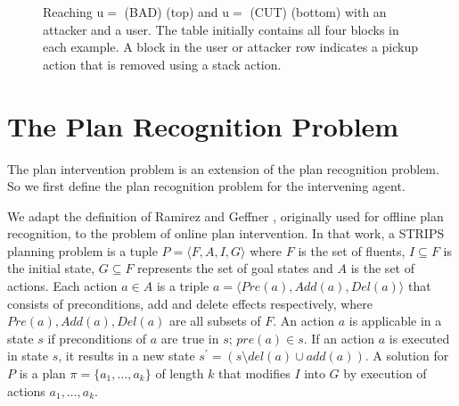 \documentclass[letterpaper]{article}
\theoremstyle{plain}
\begin{document}
\begin{figure}[t]
        \caption{Reaching $\mathrm{u}= $ (BAD) (top) and $\mathrm{u}= $ (CUT) (bottom) with an attacker and a user.  The table initially contains all four blocks in each example. A block in the user or attacker row indicates a pickup action that is removed using a stack action.}
        \label{fig:multi}
\end{figure}



\section{The Plan Recognition Problem}
\label{sec:prp}
The plan intervention problem is an extension of the plan recognition problem. So we first define the plan recognition problem for the intervening agent.

We adapt the definition of Ramirez and Geffner , originally used for offline plan recognition, to the problem of online plan intervention.
In that work, a STRIPS \cite{fikes1971strips} planning problem is a tuple $ P = \langle F, A, I, G \rangle$ where $F$ is the set of fluents, $I\subseteq F$ is the initial state, $G  \subseteq F$ represents the set of goal states and $A$ is the set of actions. 
Each action $a \in A$ is a triple $a=\langle Pre(a), Add(a), Del(a)\rangle$ that consists of preconditions, add and delete effects respectively, where $Pre(a), Add(a), Del(a)$ are all subsets of $F$. 
An action $a$ is applicable in a state $s$ if preconditions of $a$ are true in $s$; $pre(a) \in s$. 
If an action $a$ is executed in state $s$, it results in a new state $s^{\prime} = (s \setminus del(a) \cup add(a))$.  
A solution for $P$ is a plan $\pi = \{a_1, \dots ,a_k\}$ of length $k$ that modifies $I$ into $G$ by execution of actions $a_1, \dots ,a_k$.
\end{document}
